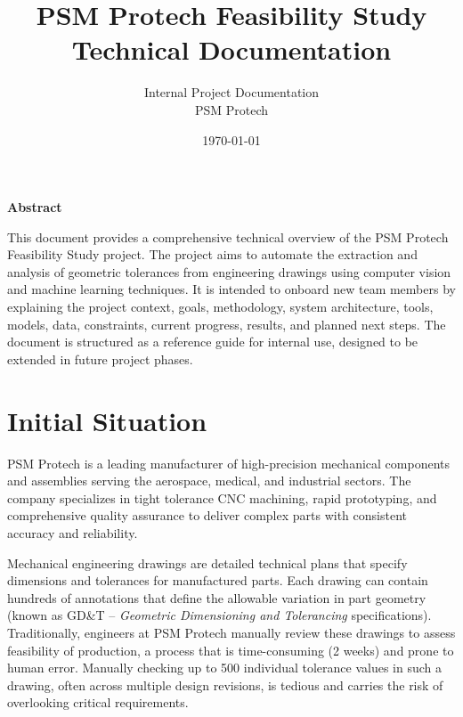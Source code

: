 \documentclass[11pt,a4paper]{article}
\title{\textbf{PSM Protech Feasibility Study}\\Technical Documentation}
\author{Internal Project Documentation \\ PSM Protech}
\date{\today}
\begin{document}
\maketitle
\thispagestyle{empty}
\begin{center}
\newpage
\textbf{Abstract}
\end{center}
\noindent
This document provides a comprehensive technical overview of the PSM Protech Feasibility Study project. The project aims to automate the extraction and analysis of geometric tolerances from engineering drawings using computer vision and machine learning techniques. It is intended to onboard new team members by explaining the project context, goals, methodology, system architecture, tools, models, data, constraints, current progress, results, and planned next steps. The document is structured as a reference guide for internal use, designed to be extended in future project phases.

\vfill
\newpage
\tableofcontents
\newpage

\section{Initial Situation}
PSM Protech is a leading manufacturer of high-precision mechanical components and assemblies serving the aerospace, medical, and industrial sectors. The company specializes in tight tolerance CNC machining, rapid prototyping, and comprehensive quality assurance to deliver complex parts with consistent accuracy and reliability.

Mechanical engineering drawings are detailed technical plans that specify dimensions and tolerances for manufactured parts. Each drawing can contain hundreds of annotations that define the allowable variation in part geometry (known as GD\&T -- \emph{Geometric Dimensioning and Tolerancing} specifications). Traditionally, engineers at PSM Protech manually review these drawings to assess feasibility of production, a process that is time-consuming (2 weeks) and prone to human error.  Manually checking up to 500 individual tolerance values in such a drawing, often across multiple design revisions, is tedious and carries the risk of overlooking critical requirements.
\end{document}

